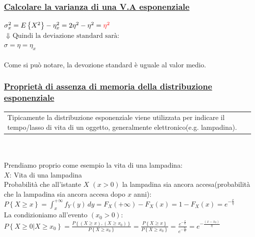 \documentclass{article}
\begin{document}
\subsubsection{\underline{Calcolare la varianza di una V.A esponenziale}}
$\sigma_x^2 = E\left\{ X^2 \right\} - \eta_x^2 = 2\eta^2 - \eta^2 = \color{red} \eta^2$ \\
$\Downarrow \text{ Quindi la deviazione standard sarà:}$ \\
$\sigma = \eta = \eta_x$ \\ \\
Come si può notare, la devozione standard è uguale al valor medio.

\subsubsection{\underline{Proprietà di assenza di memoria della distribuzione esponenziale}}
\begin{tabular}{|p{13cm}}
Tipicamente la distribuzione esponenziale viene utilizzata per indicare il tempo/lasso di vita di un oggetto, generalmente elettronico(e.g. lampadina).
\end{tabular} \\ \\
Prendiamo proprio come esempio la vita di una lampadina: \\
$X$: Vita di una lampadina \\
Probabilità che all’istante $X$ $\left(x > 0\right)$ la lampadina sia ancora accesa(probabilità che la lampadina sia ancora accesa dopo $x$ anni): \\
$P\left\{ X \geq x \right\} = \int_{x}^{+\infty} f_Y(y) \,dy = F_X(+\infty) - F_X(x) = 1-F_X(x) = e^{-\frac x \eta}$ \\
La condizioniamo all'evento $\left(x_0 >0\right)$: \\
$P\left\{X \geq 0 \big| X \geq x_0 \right\} = \frac{P\left\{ \left(X \geq x \right) , \left(X \geq x_0 \right) \right\}} {P\left\{X \geq x_0 \right\} } =
\frac{P\left\{ X \geq x  \right\}} {P\left\{X \geq x_0 \right\} } = \frac{e^{- \frac x \eta}}{e^{- \frac{x_0}{\eta}}} = e^{- \frac{ \left( x-x_0 \right)}{\eta}}$
\end{document}
